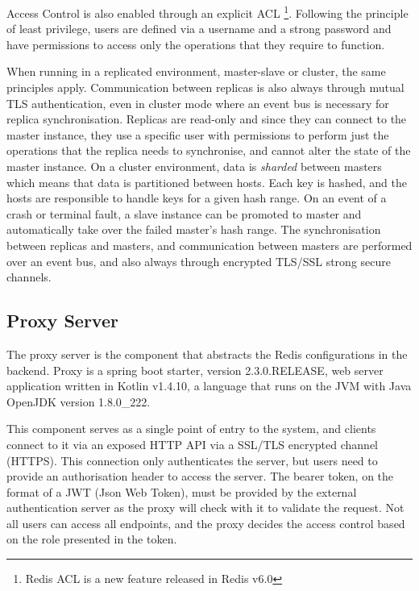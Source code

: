 Access Control is also enabled through an explicit \gls{ACL} \footnote{Redis ACL is a new feature released in Redis v6.0}. Following the principle of least privilege, users are defined via a username and a strong password and have permissions to access only the operations that they require to function.

When running in a replicated environment, master-slave or cluster, the same principles apply. Communication between replicas is also always through mutual \gls{TLS} authentication, even in cluster mode where an event bus is necessary for replica synchronisation. Replicas are read-only and since they can connect to the master instance, they use a specific user with permissions to perform just the operations that the replica needs to synchronise, and cannot alter the state of the master instance. On a cluster environment, data is \textit{sharded} between masters which means that data is partitioned between hosts. Each key is hashed, and the hosts are responsible to handle keys for a given hash range. On an event of a crash or terminal fault, a slave instance can be promoted to master and automatically take over the failed master's hash range. The synchronisation between replicas and masters, and communication between masters are performed over an event bus, and also always through encrypted \gls{TLS}/\gls{SSL} strong secure channels.

\subsection{Proxy Server}
\label{ssec:proxy_server}

The proxy server is the component that abstracts the Redis configurations in the backend. Proxy is a spring boot starter, version 2.3.0.RELEASE, web server application written in Kotlin v1.4.10, a language that runs on the \gls{JVM} with Java OpenJDK version 1.8.0\_222.

This component serves as a single point of entry to the system, and clients connect to it via an exposed \gls{HTTP} \gls{API} via a \gls{SSL}/\gls{TLS} encrypted channel (\gls{HTTPS}). This connection only authenticates the server, but users need to provide an authorisation header to access the server. The bearer token, on the format of a \gls{JWT} (Json Web Token), must be provided by the external authentication server as the proxy will check with it to validate the request. Not all users can access all endpoints, and the proxy decides the access control based on the role presented in the token.

